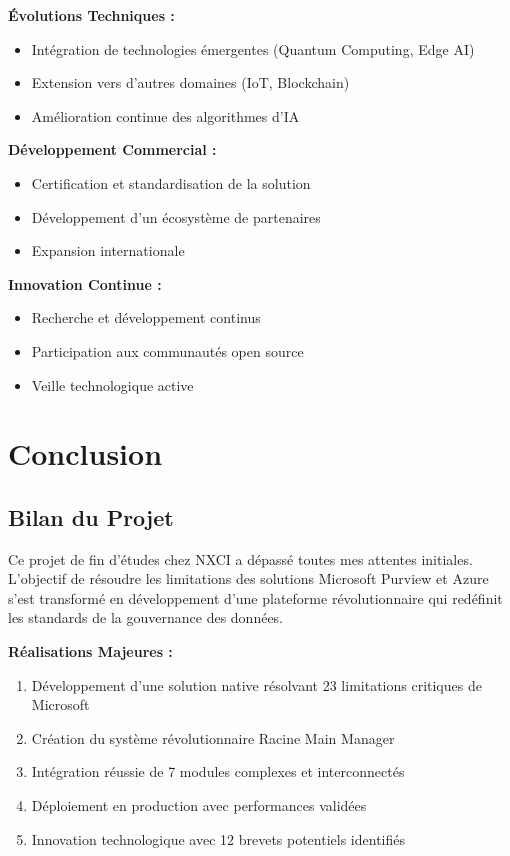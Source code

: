 \documentclass[a4paper,12pt]{article}
\begin{document}
\textbf{Évolutions Techniques :}
\begin{itemize}
    \item Intégration de technologies émergentes (Quantum Computing, Edge AI)
    \item Extension vers d'autres domaines (IoT, Blockchain)
    \item Amélioration continue des algorithmes d'IA
\end{itemize}

\textbf{Développement Commercial :}
\begin{itemize}
    \item Certification et standardisation de la solution
    \item Développement d'un écosystème de partenaires
    \item Expansion internationale
\end{itemize}

\textbf{Innovation Continue :}
\begin{itemize}
    \item Recherche et développement continus
    \item Participation aux communautés open source
    \item Veille technologique active
\end{itemize}

\newpage

\section{Conclusion}

\subsection{Bilan du Projet}

Ce projet de fin d'études chez NXCI a dépassé toutes mes attentes initiales. L'objectif de résoudre les limitations des solutions Microsoft Purview et Azure s'est transformé en développement d'une plateforme révolutionnaire qui redéfinit les standards de la gouvernance des données.

\textbf{Réalisations Majeures :}
\begin{enumerate}
    \item Développement d'une solution native résolvant 23 limitations critiques de Microsoft
    \item Création du système révolutionnaire Racine Main Manager
    \item Intégration réussie de 7 modules complexes et interconnectés
    \item Déploiement en production avec performances validées
    \item Innovation technologique avec 12 brevets potentiels identifiés
\end{enumerate}
\end{document}
